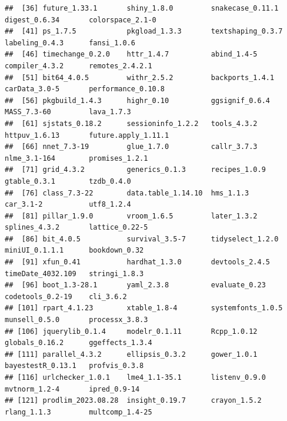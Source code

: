 \documentclass[
  12pt,
  oneside]{book}
\begin{document}
\begin{verbatim}
##  [36] future_1.33.1       shiny_1.8.0         snakecase_0.11.1    digest_0.6.34       colorspace_2.1-0   
##  [41] ps_1.7.5            pkgload_1.3.3       textshaping_0.3.7   labeling_0.4.3      fansi_1.0.6        
##  [46] timechange_0.2.0    httr_1.4.7          abind_1.4-5         compiler_4.3.2      remotes_2.4.2.1    
##  [51] bit64_4.0.5         withr_2.5.2         backports_1.4.1     carData_3.0-5       performance_0.10.8 
##  [56] pkgbuild_1.4.3      highr_0.10          ggsignif_0.6.4      MASS_7.3-60         lava_1.7.3         
##  [61] sjstats_0.18.2      sessioninfo_1.2.2   tools_4.3.2         httpuv_1.6.13       future.apply_1.11.1
##  [66] nnet_7.3-19         glue_1.7.0          callr_3.7.3         nlme_3.1-164        promises_1.2.1     
##  [71] grid_4.3.2          generics_0.1.3      recipes_1.0.9       gtable_0.3.1        tzdb_0.4.0         
##  [76] class_7.3-22        data.table_1.14.10  hms_1.1.3           car_3.1-2           utf8_1.2.4         
##  [81] pillar_1.9.0        vroom_1.6.5         later_1.3.2         splines_4.3.2       lattice_0.22-5     
##  [86] bit_4.0.5           survival_3.5-7      tidyselect_1.2.0    miniUI_0.1.1.1      bookdown_0.32      
##  [91] xfun_0.41           hardhat_1.3.0       devtools_2.4.5      timeDate_4032.109   stringi_1.8.3      
##  [96] boot_1.3-28.1       yaml_2.3.8          evaluate_0.23       codetools_0.2-19    cli_3.6.2          
## [101] rpart_4.1.23        xtable_1.8-4        systemfonts_1.0.5   munsell_0.5.0       processx_3.8.3     
## [106] jquerylib_0.1.4     modelr_0.1.11       Rcpp_1.0.12         globals_0.16.2      ggeffects_1.3.4    
## [111] parallel_4.3.2      ellipsis_0.3.2      gower_1.0.1         bayestestR_0.13.1   profvis_0.3.8      
## [116] urlchecker_1.0.1    lme4_1.1-35.1       listenv_0.9.0       mvtnorm_1.2-4       ipred_0.9-14       
## [121] prodlim_2023.08.28  insight_0.19.7      crayon_1.5.2        rlang_1.1.3         multcomp_1.4-25
\end{verbatim}

  
\end{document}

